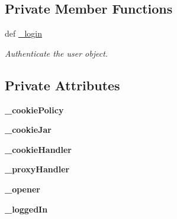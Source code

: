\subsection*{\-Private \-Member \-Functions}
\begin{DoxyCompactItemize}
\item 
def \hyperlink{class_sbs_on_demand_1_1_user_1_1_user_a693d5ddd1a04ceca4831a51ca9e81ad5}{\-\_\-login}
\begin{DoxyCompactList}\small\item\em \-Authenticate the user object. \end{DoxyCompactList}\end{DoxyCompactItemize}
\subsection*{\-Private \-Attributes}
\begin{DoxyCompactItemize}
\item 
\hypertarget{class_sbs_on_demand_1_1_user_1_1_user_a4387372607f697014416b55305e05778}{
{\bfseries \-\_\-cookie\-Policy}}
\label{class_sbs_on_demand_1_1_user_1_1_user_a4387372607f697014416b55305e05778}

\item 
\hypertarget{class_sbs_on_demand_1_1_user_1_1_user_aa847d4d50e36412845637fff3497b3d7}{
{\bfseries \-\_\-cookie\-Jar}}
\label{class_sbs_on_demand_1_1_user_1_1_user_aa847d4d50e36412845637fff3497b3d7}

\item 
\hypertarget{class_sbs_on_demand_1_1_user_1_1_user_a2ec3c07754a6d89255e27b7ca92049df}{
{\bfseries \-\_\-cookie\-Handler}}
\label{class_sbs_on_demand_1_1_user_1_1_user_a2ec3c07754a6d89255e27b7ca92049df}

\item 
\hypertarget{class_sbs_on_demand_1_1_user_1_1_user_a94337a60b3e3e108e85cc751924d9248}{
{\bfseries \-\_\-proxy\-Handler}}
\label{class_sbs_on_demand_1_1_user_1_1_user_a94337a60b3e3e108e85cc751924d9248}

\item 
\hypertarget{class_sbs_on_demand_1_1_user_1_1_user_a4d39d3112ab69aec326bc1f1c139aacd}{
{\bfseries \-\_\-opener}}
\label{class_sbs_on_demand_1_1_user_1_1_user_a4d39d3112ab69aec326bc1f1c139aacd}

\item 
\hypertarget{class_sbs_on_demand_1_1_user_1_1_user_a10f02a6312dc2e9976fa55ebfa0d2a8d}{
{\bfseries \-\_\-logged\-In}}
\label{class_sbs_on_demand_1_1_user_1_1_user_a10f02a6312dc2e9976fa55ebfa0d2a8d}

\end{DoxyCompactItemize}


